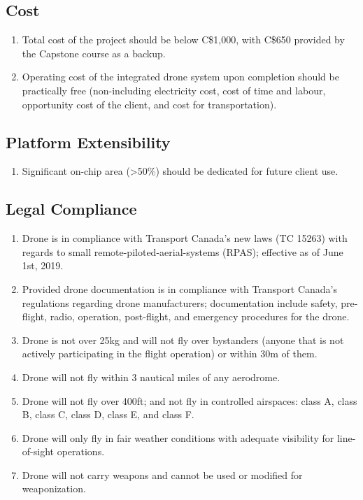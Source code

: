 \documentclass[10pt,letterpaper]{article}
\begin{document}
\subsection{Cost}
\begin{enumerate}[{C.CT}.1:]
    \item Total cost of the project should be below C\$1,000, with C\$650 provided by the Capstone course as a backup.
    \item Operating cost of the integrated drone system upon completion should be practically free (non-including electricity cost, cost of time and labour, opportunity cost of the client, and cost for transportation).
\end{enumerate}

\subsection{Platform Extensibility}
\begin{enumerate}[{C.PE}.1:]
    \item Significant on-chip area (>50\%) should be dedicated for future client use.
\end{enumerate}

\subsection{Legal Compliance}
\begin{enumerate}[{C.LG}.1:]
    \item Drone is in compliance with Transport Canada's new laws (TC 15263) with regards to small remote-piloted-aerial-systems (RPAS); effective as of June 1st, 2019.
    \item Provided drone documentation is in compliance with Transport Canada's regulations regarding drone manufacturers; documentation include safety, pre-flight, radio, operation, post-flight, and emergency procedures for the drone.
    \item Drone is not over 25kg and will not fly over bystanders (anyone that is not actively participating in the flight operation) or within 30m of them.
    \item Drone will not fly within 3 nautical miles of any aerodrome.
    \item Drone will not fly over 400ft; and not fly in controlled airspaces: class A, class B, class C, class D, class E, and class F.
    \item Drone will only fly in fair weather conditions with adequate visibility for line-of-sight operations.
    \item Drone will not carry weapons and cannot be used or modified for weaponization.
\end{enumerate}
\end{document}
